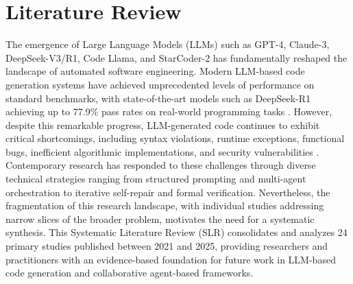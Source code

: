 \documentclass[11pt,a4paper]{article}
\begin{document}
\begin{abstract}
\noindent
 The SLR reveals that contemporary LLM-based code generation research predominantly targets individual concerns (correctness, efficiency, or security) in isolation, with limited integration across the full software development lifecycle. A significant research gap exists in unified multi-agent frameworks that simultaneously address generation quality, bug detection, iterative repair, and security enforcement. This gap justifies the development of MACI-style collaborative systems that orchestrate specialized agents through structured communication and iterative refinement to produce correct, efficient, secure, and maintainable code.

\noindent
\textbf{Keywords:} Systematic Literature Review, Large Language Models, Code Generation, Bug Taxonomy, Automated Program Repair, Multi-Agent Systems, Chain-of-Thought Prompting
\end{abstract}

\newpage

\section{Literature Review}
\label{sec:lit_review}

The emergence of Large Language Models (LLMs) such as GPT-4, Claude-3, DeepSeek-V3/R1, Code Llama, and StarCoder-2 has fundamentally reshaped the landscape of automated software engineering. Modern LLM-based code generation systems have achieved unprecedented levels of performance on standard benchmarks, with state-of-the-art models such as DeepSeek-R1 achieving up to 77.9\% pass rates on real-world programming tasks \cite{dou2026}. However, despite this remarkable progress, LLM-generated code continues to exhibit critical shortcomings, including syntax violations, runtime exceptions, functional bugs, inefficient algorithmic implementations, and security vulnerabilities \cite{bruni2025,liu2025llm4tdg}. Contemporary research has responded to these challenges through diverse technical strategies ranging from structured prompting and multi-agent orchestration to iterative self-repair and formal verification. Nevertheless, the fragmentation of this research landscape, with individual studies addressing narrow slices of the broader problem, motivates the need for a systematic synthesis. This Systematic Literature Review (SLR) consolidates and analyzes 24 primary studies published between 2021 and 2025, providing researchers and practitioners with an evidence-based foundation for future work in LLM-based code generation and collaborative agent-based frameworks.
\end{document}
